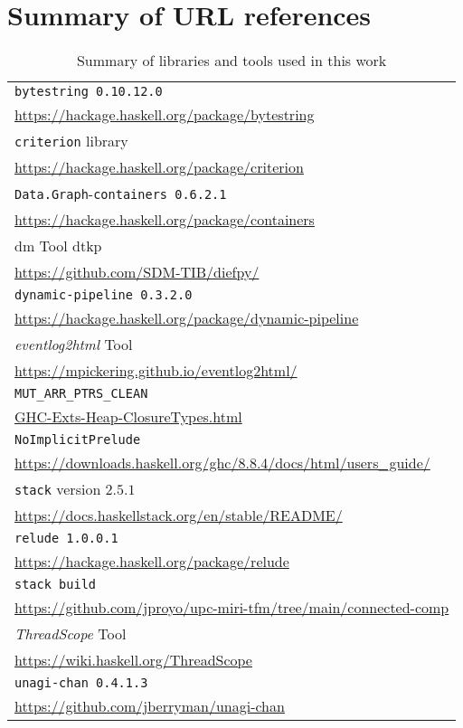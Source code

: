 \newpage
\appendix

\section{Summary of URL references}

\begin{table}[H]
\centering
\begin{tabular}{|l|}
\hline
\texttt{bytestring 0.10.12.0}\\ 
\url{https://hackage.haskell.org/package/bytestring}\\\hline
\texttt{criterion} library\\
\url{https://hackage.haskell.org/package/criterion}\\\hline
\texttt{Data.Graph}-\texttt{containers 0.6.2.1}\\ \url{https://hackage.haskell.org/package/containers}\\\hline
\acrfull{dm} Tool \acrshort{dtkp}\\ 
\url{https://github.com/SDM-TIB/diefpy/}\\\hline
\texttt{dynamic-pipeline 0.3.2.0}\\ 
\url{https://hackage.haskell.org/package/dynamic-pipeline}\\\hline
\textit{eventlog2html} Tool\\
\url{https://mpickering.github.io/eventlog2html/}\\\hline
\texttt{MUT_ARR_PTRS_CLEAN}\\
\href{https://downloads.haskell.org/~ghc/8.10.4/docs/html/libraries/ghc-heap-8.10.4/GHC-Exts-Heap-ClosureTypes.html}{GHC-Exts-Heap-ClosureTypes.html}\\\hline
\texttt{NoImplicitPrelude}\\ 
\url{https://downloads.haskell.org/ghc/8.8.4/docs/html/users_guide/}\\\hline
\texttt{stack} version $2.5.1$\\ 
\url{https://docs.haskellstack.org/en/stable/README/}\\\hline
\texttt{relude 1.0.0.1}\\ 
\url{https://hackage.haskell.org/package/relude}\\\hline
\texttt{stack build}\\ 
\url{https://github.com/jproyo/upc-miri-tfm/tree/main/connected-comp}\\\hline
\textit{ThreadScope} Tool\\
\url{https://wiki.haskell.org/ThreadScope}\\\hline
\texttt{unagi-chan 0.4.1.3}\\
\url{https://github.com/jberryman/unagi-chan}\\\hline
\end{tabular}
\caption{Summary of libraries and tools used in this work} \label{tab:libraries}
\end{table}

